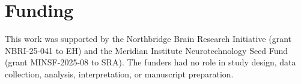 \section{Funding}

This work was supported by the Northbridge Brain Research Initiative (grant NBRI-25-041 to EH) and the Meridian Institute Neurotechnology Seed Fund (grant MINSF-2025-08 to SRA). The funders had no role in study design, data collection, analysis, interpretation, or manuscript preparation.
